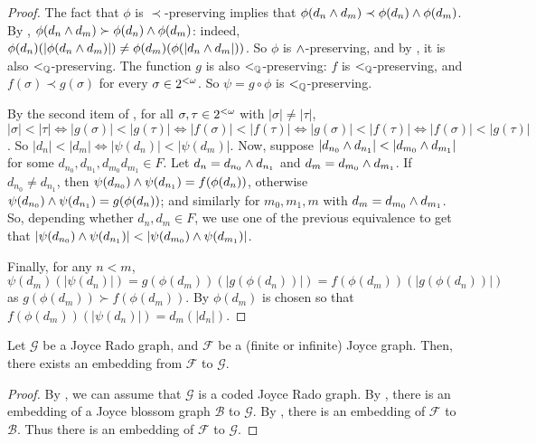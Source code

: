 \begin{proof}
  The fact that $\phi$ is $\prec$-preserving implies that $\phi(d_n\wedge d_m)\prec\phi(d_n)\wedge\phi(d_m)$. By , $\phi(d_n\wedge d_m)\succ\phi(d_n)\wedge\phi(d_m)$: indeed, $\phi(d_n)(|\phi(d_n\wedge d_m)|)\neq \phi(d_m)(\phi(|d_n\wedge d_m|))$. So $\phi$ is $\wedge$-preserving, and by , it is also $<_{\mathbb{Q}}$-preserving. The function $g$ is also $<_{\mathbb{Q}}$-preserving: $f$ is $<_{\mathbb{Q}}$-preserving, and $f(\sigma)\prec g(\sigma)$ for every $\sigma\in{2^{<\omega}}$. So $\psi=g\circ\phi$ is $<_{\mathbb{Q}}$-preserving.

  By the second item of , for all $\sigma,\tau\in{2^{<\omega}}$ with $|\sigma|\neq|\tau|$, $|\sigma|<|\tau|\iff |g(\sigma)|<|g(\tau)|\iff |f(\sigma)|<|f(\tau)|\iff |g(\sigma)|<|f(\tau)|\iff |f(\sigma)|<|g(\tau)|$. So $|d_n|<|d_m|\iff |\psi(d_n)|<|\psi(d_m)|$. Now, suppose $|d_{n_0}\meet d_{n_1}|<|d_{m_0}\meet d_{m_1}|$ for some $d_{n_0},d_{n_1},d_{m_0}d_{m_1}\in F$. Let $d_n=d_{n_0}\wedge d_{n_1}$ and $d_m=d_{m_0}\wedge d_{m_1}$. If $d_{n_0}\neq d_{n_1}$, then $\psi(d_{n_0})\wedge\psi(d_{n_1})=f(\phi(d_n))$, otherwise $\psi(d_{n_0})\wedge\psi(d_{n_1})=g(\phi(d_n))$; and similarly for $m_0, m_1, m$ with $d_m=d_{m_0}\wedge d_{m_1}$. So, depending whether $d_n, d_m\in F$, we use one of the previous equivalence to get that  $|\psi(d_{n_0})\meet \psi(d_{n_1})|<|\psi(d_{m_0})\meet \psi(d_{m_1})|$.
  

  Finally, for any $n<m$,
  \[
  	\psi(d_m)(|\psi(d_n)|)= g(\phi(d_m))(|g(\phi(d_n))|)=f(\phi(d_m))(|g(\phi(d_n))|)
  \]
  as $g(\phi(d_m))\succ f(\phi(d_m))$. By  $\phi(d_m)$ is chosen so that $f(\phi(d_m))(|\psi(d_n)|)= d_m(|d_n|)$.
\end{proof}

\begin{corollary}[$\ACA_0$]\label{th:4.1LaflammeRado}
  Let $\mathcal{G}$ be a Joyce Rado graph, and $\mathcal{F}$ be a (finite or infinite) Joyce graph. Then, there exists an embedding from $\mathcal{F}$ to $\mathcal{G}$.
\end{corollary}
\begin{proof}
By , we can assume that $\mathcal{G}$ is a coded Joyce Rado graph.
By , there is an embedding of a Joyce blossom graph $\mathcal{B}$ to $\mathcal{G}$. By ,
there is an embedding of $\mathcal{F}$ to $\mathcal{B}$. Thus there is an embedding of $\mathcal{F}$ to $\mathcal{G}$.
\end{proof}

